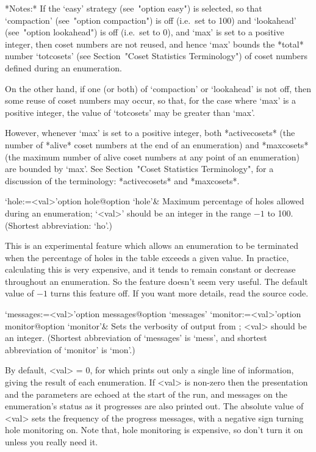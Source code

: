 *Notes:*
If the `easy'  strategy  (see~"option  easy")  is  selected,  so  that
`compaction' (see~"option compaction") is off (i.e.~set  to  100)  and
`lookahead' (see~"option lookahead") is off (i.e.~set to 0), and `max'
is set to a positive integer, then coset numbers are not  reused,  and
hence `max' bounds the *total* number `totcosets' (see  Section~"Coset
Statistics  Terminology")  of  coset   numbers   defined   during   an
enumeration.

On the other hand, if one (or both) of `compaction' or `lookahead'  is
not off, then some reuse of coset numbers may occur, so that, for  the
case where `max' is a positive integer, the value of  `totcosets'  may
be greater than `max'.

However,  whenever  `max'  is  set  to  a   positive   integer,   both
*activecosets* (the number of *alive* coset numbers at the end  of  an
enumeration) and  *maxcosets*  (the  maximum  number  of  alive  coset
numbers at any point of an enumeration)  are  bounded  by  `max'.  See
Section~"Coset  Statistics  Terminology",  for  a  discussion  of  the
terminology: *activecosets* and *maxcosets*.

\>`hole:=<val>'{option hole}@{option `hole'}&
Maximum percentage of holes allowed during an enumeration;
`<val>' should be an integer in the range $-1$ to 100.
(Shortest abbreviation: `ho'.)

This is an experimental feature which  allows  an  enumeration  to  be
terminated when the percentage of holes in the table exceeds  a  given
value. In practice, calculating this is very expensive, and  it  tends
to remain constant or  decrease  throughout  an  enumeration.  So  the
feature doesn't seem very useful. The default value of $-1$ turns this
feature off. If you want more details, read the source code.

\enditems


\beginitems

\>`messages:=<val>'{option messages}@{option `messages'}
\>`monitor:=<val>'{option monitor}@{option `monitor'}&
Sets the verbosity of output from {\ACE}; <val> should be an integer.
(Shortest  abbreviation  of  `messages'  is   `mess',   and   shortest
abbreviation of `monitor' is `mon'.)

By default, <val> = 0, for which {\ACE} prints out only a single  line
of information, giving the result of each  enumeration.  If  <val>  is
non-zero then the presentation and the parameters are  echoed  at  the
start of the run, and messages  on  the  enumeration's  status  as  it
progresses are also printed out. The absolute value of <val> sets  the
frequency of the progress messages, with a negative sign turning  hole
monitoring on. Note that, hole monitoring is expensive, so don't  turn
it on unless you really need it.

